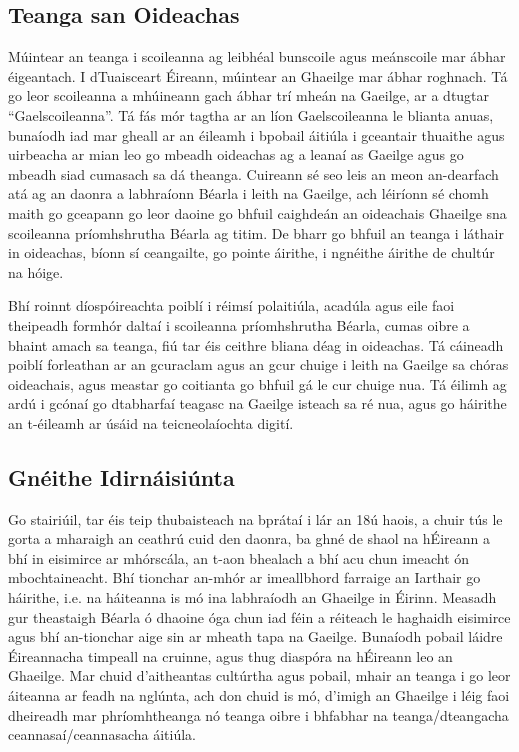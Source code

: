 \begin{multicols}{2}
\subsection{Teanga san Oideachas}

Múintear an teanga i scoileanna ag leibhéal bunscoile agus meánscoile mar ábhar éigeantach. I dTuaisceart Éireann, múintear an Ghaeilge mar ábhar roghnach. Tá go leor scoileanna a mhúineann gach ábhar trí mheán na Gaeilge, ar a dtugtar “Gaelscoileanna”. Tá fás mór tagtha ar an líon Gaelscoileanna le blianta anuas, bunaíodh iad mar gheall ar an éileamh i bpobail áitiúla i gceantair thuaithe agus uirbeacha ar mian leo go mbeadh oideachas ag a leanaí as Gaeilge agus go mbeadh siad cumasach sa dá theanga. Cuireann sé seo leis an meon an-dearfach atá ag an daonra a labhraíonn Béarla i leith na Gaeilge, ach léiríonn sé chomh maith go gceapann go leor daoine go bhfuil caighdeán an oideachais Ghaeilge sna scoileanna príomhshrutha Béarla ag titim. De bharr go bhfuil an teanga i láthair in oideachas, bíonn sí ceangailte, go pointe áirithe, i ngnéithe áirithe de chultúr na hóige. 

Bhí roinnt díospóireachta poiblí i réimsí polaitiúla, acadúla agus eile faoi theipeadh formhór daltaí i scoileanna príomhshrutha Béarla, cumas oibre a bhaint amach sa teanga, fiú tar éis ceithre bliana déag in oideachas. Tá cáineadh poiblí forleathan ar an gcuraclam agus an gcur chuige i leith na Gaeilge sa chóras oideachais, agus meastar go coitianta go bhfuil gá le cur chuige nua. Tá éilimh ag ardú i gcónaí go dtabharfaí teagasc na Gaeilge isteach sa ré nua, agus go háirithe an t-éileamh ar úsáid na teicneolaíochta digití.


\subsection{Gnéithe Idirnáisiúnta}

Go stairiúil, tar éis teip thubaisteach na bprátaí i lár an 18ú haois, a chuir tús le gorta a mharaigh an ceathrú cuid den daonra, ba ghné de shaol na hÉireann a bhí in eisimirce ar mhórscála, an t-aon bhealach a bhí acu chun imeacht ón mbochtaineacht. Bhí tionchar an-mhór ar imeallbhord farraige an Iarthair go háirithe, i.e. na háiteanna is mó ina labhraíodh an Ghaeilge in Éirinn.  Measadh gur theastaigh Béarla ó dhaoine óga chun iad féin a réiteach le haghaidh eisimirce agus bhí an-tionchar aige sin ar mheath tapa na Gaeilge. Bunaíodh pobail láidre Éireannacha timpeall na cruinne, agus thug diaspóra na hÉireann leo an Ghaeilge. Mar chuid d’aitheantas cultúrtha agus pobail, mhair an teanga i go leor áiteanna ar feadh na nglúnta, ach don chuid is mó, d’imigh an Ghaeilge i léig faoi dheireadh mar phríomhtheanga nó teanga oibre i bhfabhar na teanga/dteangacha ceannasaí/ceannasacha áitiúla. 


\end{multicols}
